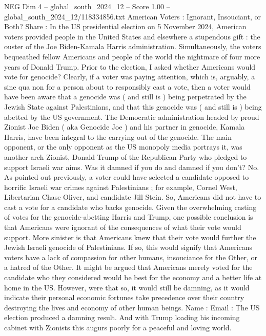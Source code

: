 \begin{textsample}{NEG Dim 4 – global\_south\_2024\_12 – Score 1.00 – global\_south\_2024\_12/118334856.txt}  \label{ex:f4_neg_221}
American Voters : Ignorant, Insouciant, or Both?
Share : In the US presidential election on 5 November 2024, American voters provided people in the United States and elsewhere a stupendous gift : the ouster of the Joe Biden-Kamala Harris administration.
Simultaneously, the voters bequeathed fellow Americans and people of the world the nightmare of four more years of Donald Trump.
Prior to the election, I asked whether Americans would vote for genocide?
Clearly, if a voter was paying attention, which is, arguably, a sine qua non for a person about to responsibly cast a vote, then a voter would have been aware that a genocide was ( and still is ) being perpetrated by the Jewish State against Palestinians, and that this genocide was ( and still is ) being abetted by the US government.
The Democratic administration headed by proud Zionist Joe Biden ( aka Genocide Joe ) and his partner in genocide, Kamala Harris, have been integral to the carrying out of the genocide.
The main opponent, or the only opponent as the US monopoly media portrays it, was another arch Zionist, Donald Trump of the Republican Party who pledged to support Israeli war aims.
Was it damned if you do and damned if you don't?
No.
As pointed out previously, a voter could have selected a candidate opposed to horrific Israeli war crimes against Palestinians ; for example, Cornel West, Libertarian Chase Oliver, and candidate Jill Stein.
So, Americans did not have to cast a vote for a candidate who backs genocide.
Given the overwhelming casting of votes for the genocide-abetting Harris and Trump, one possible conclusion is that Americans were ignorant of the consequences of what their vote would support.
More sinister is that Americans knew that their vote would further the Jewish Israeli genocide of Palestinians.
If so, this would signify that Americans voters have a lack of compassion for other humans, insouciance for the Other, or a hatred of the Other.
It might be argued that Americans merely voted for the candidate who they considered would be best for the economy and a better life at home in the US.
However, were that so, it would still be damning, as it would indicate their personal economic fortunes take precedence over their country destroying the lives and economy of other human beings.
Name : Email : The US election produced a damning result.
And with Trump loading his incoming cabinet with Zionists this augurs poorly for a peaceful and loving world.

\end{textsample}
